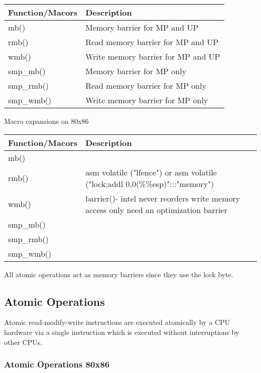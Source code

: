 \documentclass{article}
\begin{document}
\begin{center}
  \begin{tabular}{ l | l }    
    \hline
    Function/Macors & Description \\ \hline
    mb() & Memory barrier for MP and UP \\ 
    rmb() & Read memory barrier for MP and UP  \\ 
    wmb() &  Write memory barrier for MP and UP \\
    smp\_mb() &  Memory barrier for MP only \\
    smp\_rmb() &  Read memory barrier for MP only \\
    smp\_wmb() &  Write memory barrier for MP only \\
    \hline
  \end{tabular}
\end{center}
  Macro expansions on  80x86


  \begin{tabular}{ l | p{5 cm} }    
    \hline
    Function/Macors & Description \\ \hline
    mb() &  \\ 
    rmb() & asm volatile ("lfence") or asm volatile ("lock;addl 0,0(\%\%esp)":::"memory")  \\ 
    wmb() & barrier()- intel never reorders write memory access only need an optimization barrier  \\
    smp\_mb() &   \\
    smp\_rmb() &  \\
    smp\_wmb() &  \\
    \hline
  \end{tabular}

All atomic operations act as memory barriers since they use the lock byte.

\subsection{Atomic Operations}

Atomic read-modify-write instructions are executed atomically by a CPU
hardware via a single instruction which is executed without
interruptions by other CPUs.

\subsubsection{Atomic Operations 80x86}
\end{document}
